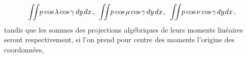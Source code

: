 \documentclass[11pt, twoside, leqno]{article}
\newcommand\cosine{\operatorname{cos} \hspace{-0.1ex}}
\begin{document}
\begin{equation}\label{integrales.1}
\displaystyle\iint \hspace{-.5ex} p \hspace{.05ex} \cosine \lambda \cosine \gamma \hspace{.4ex} dy \hspace{.3ex} dx \hspace{.2ex} \text{,} \hspace{.5em}
\displaystyle\iint \hspace{-.5ex} p \hspace{.05ex} \cosine \mu \cosine \gamma \hspace{.4ex} dy \hspace{.3ex} dx \hspace{.2ex} \text{,} \hspace{.5em}
\displaystyle\iint \hspace{-.5ex} p \hspace{.05ex} \cosine \nu \cosine \gamma \hspace{.3ex} dy \hspace{.2ex} dx \hspace{.3ex} \text{,}
\end{equation}
tandis que les sommes des projections algébriques de leurs moments linéaires seront respectivement, si l'on prend pour centre des moments l'origine des coordonnées,
\end{document}
